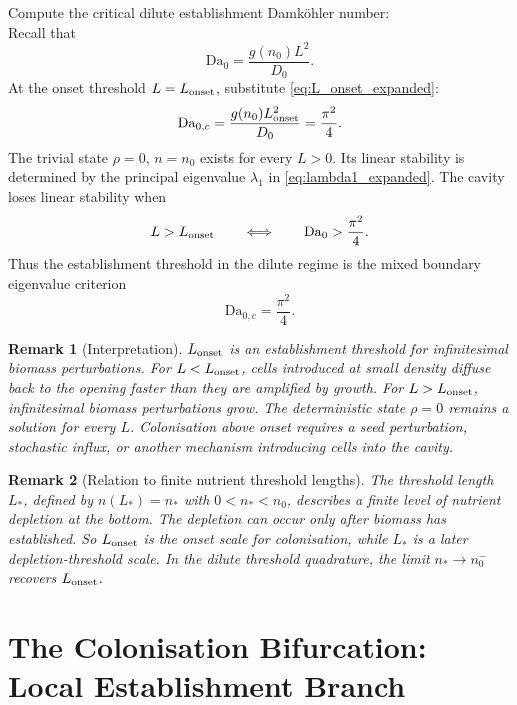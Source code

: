 \documentclass[11pt,a4paper]{report}
\newtheorem{remark}{Remark}
\begin{document}
	Compute the critical dilute establishment Damk\"ohler number:\\
	Recall that
	\[
	\mathrm{Da}_0=\frac{g(n_0)L^2}{D_0}.
	\]
	At the onset threshold $L=L_{\rm onset}$, substitute \eqref{eq:L_onset_expanded}:
	\begin{align}
		\mathrm{Da}_{0,c}
		=
		\frac{g(n_0)L_{\rm onset}^2}{D_0}
		=
		\frac{\pi^2}{4}.
	\end{align}
	The trivial state $\rho= 0$, $n= n_0$ exists for every $L>0$.  Its linear stability is determined by the principal eigenvalue $\lambda_1$ in \eqref{eq:lambda1_expanded}.  The cavity loses linear stability when
	\[
	L>L_{\rm onset}
	\qquad\Longleftrightarrow\qquad
	\mathrm{Da}_0>\frac{\pi^2}{4}.
	\]
	Thus the establishment threshold in the dilute regime is the mixed boundary eigenvalue criterion
	\[
	\mathrm{Da}_{0,c}=\frac{\pi^2}{4}.
	\]		
	
	\begin{remark}[Interpretation]
		$L_{\rm onset}$ is an establishment threshold for infinitesimal biomass
		perturbations.  For $L<L_{\rm onset}$, cells introduced at small density
		diffuse back to the opening faster than they are amplified by growth.  For
		$L>L_{\rm onset}$, infinitesimal biomass perturbations grow.  The
		deterministic state $\rho=0$ remains a solution for every $L$.
		Colonisation above onset requires a seed perturbation, stochastic influx,
		or another mechanism introducing cells into the cavity.
	\end{remark}
	
	\begin{remark}[Relation to finite nutrient threshold lengths]
		The threshold length $L_*$, defined by $n(L_*)=n_*$ with
		$0<n_*<n_0$, describes a finite level of nutrient depletion at the
		bottom. The depletion can occur only after biomass has established.
		So $L_{\rm onset}$ is the onset scale for colonisation, while
		$L_*$ is a later depletion-threshold scale.  In the dilute threshold
		quadrature, the limit $n_*\to n_0^-$ recovers $L_{\rm onset}$.
	\end{remark}
	
	\section{The Colonisation Bifurcation: Local Establishment Branch}
	\label{sec:bifurcationonset}
	
\end{document}
